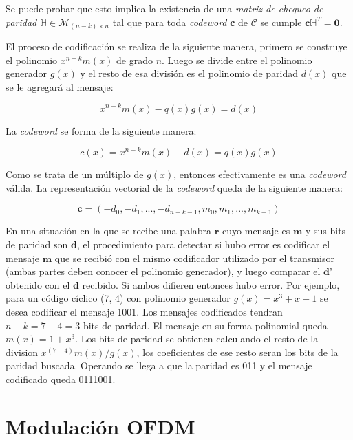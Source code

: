 Se puede probar que esto implica la existencia de una \textit{matriz de chequeo de paridad} $\mathbb{H} \in \mathcal{M}_{(n-k)\times n}$ tal que para toda \textit{codeword} \textbf{c} de $\mathcal{C}$ se cumple $\textbf{c} \mathbb{H} ^T = \textbf{0}$.


El proceso de codificación se realiza de la siguiente manera, primero se construye el polinomio $x^{n-k}m(x)$ de grado $n$. Luego se divide entre el polinomio generador $g(x)$ y el resto de esa división es el polinomio de paridad $d(x)$ que se le agregará al mensaje:

\begin{equation}
x^{n-k}m(x) - q(x)g(x) = d(x)
\end{equation}

La \textit{codeword} se forma de la siguiente manera:

\begin{equation}
c(x) = x^{n-k}m(x)-d(x) = q(x)g(x)
\end{equation}

Como se trata de un múltiplo de $g(x)$, entonces efectivamente es una \textit{codeword} válida. La representación vectorial de la \textit{codeword} queda de la siguiente manera:

\begin{equation}
\textbf{c} = (-d_0, -d_1, ..., -d_{n-k-1}, m_0, m_1, ..., m_{k-1})
\end{equation}

En una situación en la que se recibe una palabra $\textbf{r}$ cuyo mensaje es $\textbf{m}$  y sus bits de paridad son $\textbf{d}$, el procedimiento para detectar si hubo error es codificar el mensaje $\textbf{m}$ que se recibió con el mismo codificador utilizado por el transmisor (ambas partes deben conocer el polinomio generador), y luego comparar el $\textbf{d'}$ obtenido con el $\textbf{d}$ recibido. Si ambos difieren entonces hubo error. 
Por ejemplo, para un código cíclico (7, 4) con polinomio generador $g(x) = x^3 + x + 1$ se desea codificar el mensaje 1001. Los mensajes codificados tendran $n-k = 7 - 4 = 3$ bits de paridad. El mensaje en su forma polinomial queda $m(x) = 1 + x^3$.
Los bits de paridad se obtienen calculando el resto de la division $x^{(7-4)}m(x)/g(x)$, los coeficientes de ese resto seran los bits de la paridad buscada. Operando se llega a que la paridad es 011 y el mensaje codificado queda 0111001.

\section{Modulación OFDM}

